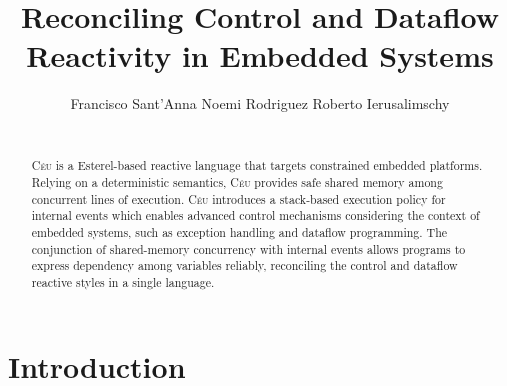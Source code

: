 \documentclass{acm_proc_article-sp}
\newcommand{\CEU}{\textsc{C\'{e}u}\xspace}
\newcommand{\1}{\;}
\newcommand{\2}{\;\;}
\newcommand{\3}{\;\;\;}
\newcommand{\5}{\;\;\;\;\;}
\begin{document}
\title {
    Reconciling Control and Dataflow Reactivity in Embedded Systems
}

\author{
    \alignauthor
    Francisco Sant'Anna \hspace{1cm} Noemi Rodriguez \hspace{1cm} Roberto Ierusalimschy   \\
     \\
}

\maketitle

\begin{abstract}
\CEU is a Esterel-based reactive language that targets constrained embedded 
platforms.
%
Relying on a deterministic semantics, \CEU provides safe shared memory among 
concurrent lines of execution.
%
\CEU introduces a stack-based execution policy for internal events which 
enables advanced control mechanisms considering the context of embedded 
systems, such as exception handling and dataflow programming.
%
The conjunction of shared-memory concurrency with internal events allows 
programs to express dependency among variables reliably, reconciling the 
control and dataflow reactive styles in a single language.
%
\end{abstract}




\section{Introduction}

\end{document}
